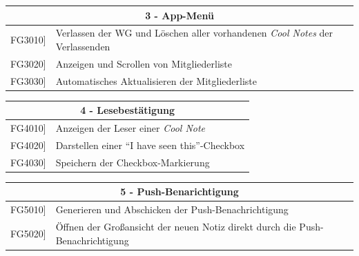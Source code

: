 \documentclass[a4paper]{scrreprt}
\begin{document}
    		\vspace{5mm}
    		
    		\begin{table}[h!]
    			\centering
    			\label{my-label}
    			\begin{tabular}{p{2cm}p{12cm}}
    				
    				\multicolumn{2}{c}{\textbf{3 - App-Menü}} \\ \hline
    				\centering{[}FG3010{]} & Verlassen der WG und Löschen aller vorhandenen \textit{Cool Notes} der Verlassenden\\
    				\centering{[}FG3020{]} & Anzeigen und Scrollen von Mitgliederliste \\
    				\centering{[}FG3030{]} & Automatisches Aktualisieren der Mitgliederliste\\
    				\hline
    			\end{tabular}
    		\end{table}
    		
    		\vspace{5mm}
    		
    		\begin{table}[h!]
    			\centering
    			\label{my-label}
    			\begin{tabular}{p{2cm}p{12cm}}
    				
    				\multicolumn{2}{c}{\textbf{4 - Lesebestätigung}} \\ \hline
    				\centering{[}FG4010{]} & Anzeigen der Leser einer \textit{Cool Note}\\
    				\centering{[}FG4020{]}& Darstellen einer ``I have seen this”-Checkbox                               \\
    				\centering{[}FG4030{]}& Speichern der Checkbox-Markierung \\ 
    				
    				\hline
    			\end{tabular}
    		\end{table}
    		
    		\vspace{5mm}
    		
    		\begin{table}[h!]
    			\centering
    			\label{my-label}
    			\begin{tabular}{p{2cm}p{12cm}}
    				
    				\multicolumn{2}{c}{\textbf{5 - Push-Benarichtigung}} \\ \hline
    				\centering{[}FG5010{]} & Generieren und Abschicken der Push-Benachrichtigung\\
    				\centering{[}FG5020{]}&Öffnen der Großansicht der neuen Notiz direkt durch die Push-Benachrichtigung            \\ 
    				
    				\hline
    			\end{tabular}
    		\end{table}
    		
\end{document}
